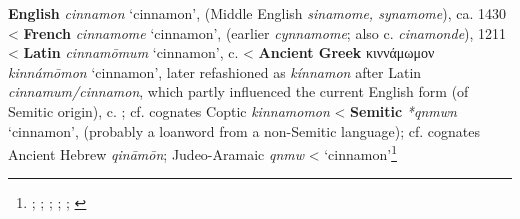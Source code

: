 \begin{etymology}\label{ety:cinnamon}
\textbf{English} \textit{cinnamon} `cinnamon', (Middle English \textit{sinamome, synamome}), ca. 1430
< \textbf{French} \textit{cinnamome} `cinnamon', (earlier \textit{cynnamome}; also  c. \textit{cinamonde}), 1211
< \textbf{Latin} \textit{cinnamōmum} `cinnamon',  c. \AD{}
< \textbf{Ancient Greek} {κιννάμωμον} \textit{kinnámōmon} `cinnamon', later refashioned as \textit{kínnamon} after Latin \textit{cinnamum/cinnamon}, which partly influenced the current English form (of Semitic origin),  c. \BC{}; cf. cognates Coptic  \textit{kinnamomon}
< \textbf{Semitic} \textit{*qnmwn} `cinnamon', (probably a loanword from a non-Semitic language); cf. cognates Ancient Hebrew  \textit{qināmōn}; Judeo-Aramaic  \textit{qnmw}
< `cinnamon'\footnote{\textcite[s.v. cinnamon]{oed}; \textcite{tlfi}; \textcite{lewis_latin_1879}; \textcite[701]{beekes_etymological_2010}; \textcite[585]{klein_comprehensive_1987}; \textcite{rosol_early_2018}}
\end{etymology}